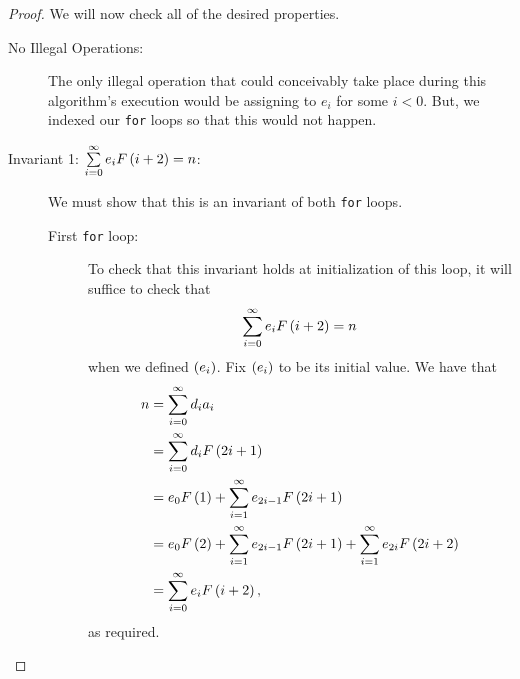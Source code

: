 \documentclass[english,12pt]{article}
\newcommand{\seq}{\p}
\begin{document}
\begin{proof}
We will now check all of the desired properties.
\begin{description}
\item[No Illegal Operations:] The only illegal operation that could conceivably take place during this algorithm's execution would be assigning to $e_i$ for some $i<0$.  But, we indexed our \texttt{for} loops so that this would not happen.
\item[Invariant 1: $\sum\limits_{i=0}^\infty e_iF\left(i+2\right)=n$:] We must show that this is an invariant of both \texttt{for} loops.
\begin{description}
\item[First \texttt{for} loop:] To check that this invariant holds at initialization of this loop, it will suffice to check that
\[
\sum_{i=0}^\infty e_iF\left(i+2\right)=n
\]
when we defined $\seq{e_i}$.  Fix $\seq{e_i}$ to be its initial value.  We have that
\begin{align*}
n&=\sum_{i=0}^\infty d_ia_i\\
&=\sum_{i=0}^\infty d_iF\left(2i+1\right)\\
&=e_0F\left(1\right)+\sum_{i=1}^\infty e_{2i-1}F\left(2i+1\right)\\
&=e_0F\left(2\right)+\sum_{i=1}^\infty e_{2i-1}F\left(2i+1\right)+\sum_{i=1}^\infty e_{2i}F\left(2i+2\right)\\
&=\sum_{i=0}^\infty e_iF\left(i+2\right),
\end{align*}
as required.


\end{description}
\end{description}
\end{proof}
\end{document}
